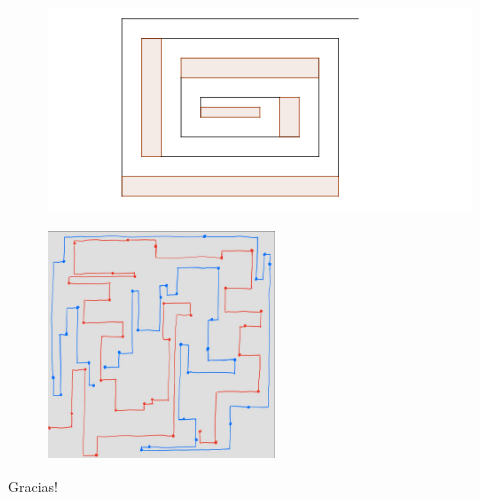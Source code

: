 \documentclass{beamer}
\begin{document}
\begin{frame}
\begin{figure}[h]
\includegraphics[width=\textwidth]{Caso-de-n-cuartos-steiner-5}
\end{figure}
\end{frame}
\begin{frame}
\begin{figure}[h]
\includegraphics[width=6cm, height=6cm]{ejemplo-trayectoria}
\end{figure}
\end{frame}
\begin{frame}
\begin{center}
\begin{Huge}
Gracias!
\end{Huge}
\end{center}
\end{frame}
\end{document}
